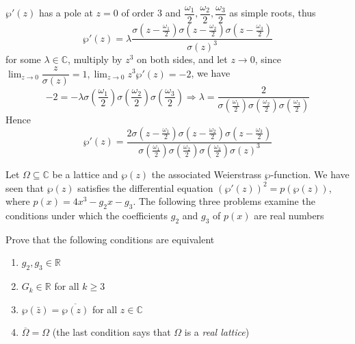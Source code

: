 \documentclass[main]{subfiles}
\begin{document}
\begin{solution}
$\wp'(z)$ has a pole at $z=0$ of order $3$ and $\dfrac{\omega_1}{2},\dfrac{\omega_2}{2},\dfrac{\omega_3}{2}$ as simple roots, thus \[
\wp'(z)=\lambda\dfrac{\sigma\left(z-\frac{\omega_1}{2}\right)\sigma\left(z-\frac{\omega_2}{2}\right)\sigma\left(z-\frac{\omega_3}{2}\right)}{\sigma(z)^3}\]
for some $\lambda\in\mathbb{C}$, multiply by $z^3$ on both sides, and let $z\rightarrow 0$, since $\displaystyle\lim_{z\rightarrow 0}\dfrac{z}{\sigma(z)}=1, \lim_{z\rightarrow 0}z^3\wp'(z)=-2$, we have
\[-2=-\lambda\sigma\left(\dfrac{\omega_1}{2}\right)\sigma\left(\dfrac{\omega_2}{2}\right)\sigma\left(\dfrac{\omega_3}{2}\right)\Rightarrow \lambda=\dfrac{2}{\sigma\left(\frac{\omega_1}{2}\right)\sigma\left(\frac{\omega_2}{2}\right)\sigma\left(\frac{\omega_3}{2}\right)}\]
Hence
\[\wp'(z)=\dfrac{2\sigma\left(z-\frac{\omega_1}{2}\right)\sigma\left(z-\frac{\omega_2}{2}\right)\sigma\left(z-\frac{\omega_3}{2}\right)}{\sigma\left(\frac{\omega_1}{2}\right)\sigma\left(\frac{\omega_2}{2}\right)\sigma\left(\frac{\omega_3}{2}\right)\sigma(z)^3}\]
\end{solution}

Let $\Omega\subseteq \mathbb C$ be a lattice and $\wp(z)$ the associated Weierstrass $\wp$-function. We have seen that $\wp(z)$ satisfies the differential equation $(\wp'(z))^2 = p(\wp(z))$, where $p(x) = 4x^3-g_2x-g_3$. The following three problems examine the conditions under which the coefficients $g_2$ and $g_3$ of $p(x)$ are real numbers

\begin{exercise}
Prove that the following conditions are equivalent
\begin{enumerate}[label=(\roman*), leftmargin=*, align=left]
\item $g_2,g_3\in\mathbb R$
\item $G_k\in \mathbb R$ for all $k\geq 3$
\item $\wp(\bar z) = \overline{\wp(z)}$ for all $z\in\mathbb C$
\item $\overline{\Omega} = 
\Omega$ (the last condition says that $\Omega$ is a \textit{real lattice})
\end{enumerate}
\end{exercise}
\end{document}
